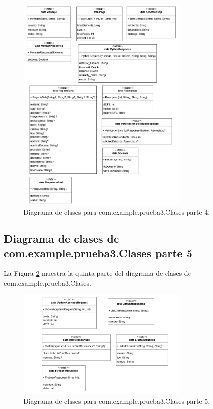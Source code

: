 \begin{figure}[htbp!]
	\begin{center}
		\includegraphics[width=0.75\textwidth]{DiagramasMoviles/DCM (5)}
		\caption{Diagrama de clases para com.example.prueba3.Clases parte 4.}
		\label{fig:Clases4}
	\end{center}
\end{figure}

\newpage

\subsection{Diagrama de clases de com.example.prueba3.Clases parte 5}

La Figura \ref{fig:Clases5} muestra la quinta parte del diagrama de clases de com.example.prueba3.Clases.

\begin{figure}[htbp!]
	\begin{center}
		\includegraphics[width=0.75\textwidth]{DiagramasMoviles/DCM (6)}
		\caption{Diagrama de clases para com.example.prueba3.Clases parte 5.}
		\label{fig:Clases5}
	\end{center}
\end{figure}

\newpage
